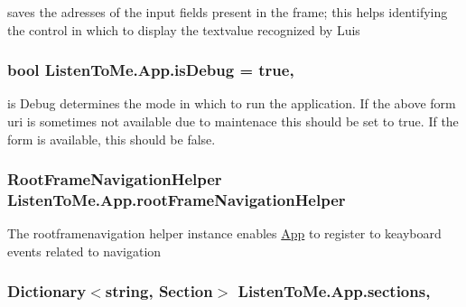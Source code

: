 saves the adresses of the input fields present in the frame; this helps identifying the control in which to display the textvalue recognized by Luis 

\subsubsection[{\texorpdfstring{is\+Debug}{isDebug}}]{\setlength{\rightskip}{0pt plus 5cm}bool Listen\+To\+Me.\+App.\+is\+Debug = true\hspace{0.3cm}{\ttfamily [static]}, {\ttfamily [package]}}\hypertarget{class_listen_to_me_1_1_app_a59acc333f6141d00101170b53ad29754}{}\label{class_listen_to_me_1_1_app_a59acc333f6141d00101170b53ad29754}


is Debug determines the mode in which to run the application. If the above form uri is sometimes not available due to maintenace this should be set to true. If the form is available, this should be false. 

\subsubsection[{\texorpdfstring{root\+Frame\+Navigation\+Helper}{rootFrameNavigationHelper}}]{\setlength{\rightskip}{0pt plus 5cm}Root\+Frame\+Navigation\+Helper Listen\+To\+Me.\+App.\+root\+Frame\+Navigation\+Helper\hspace{0.3cm}{\ttfamily [private]}}\hypertarget{class_listen_to_me_1_1_app_a92eb573f880ce92d5b9fa79b90ba3f41}{}\label{class_listen_to_me_1_1_app_a92eb573f880ce92d5b9fa79b90ba3f41}


The rootframenavigation helper instance enables \hyperlink{class_listen_to_me_1_1_app}{App} to register to keayboard events related to navigation 

\subsubsection[{\texorpdfstring{sections}{sections}}]{\setlength{\rightskip}{0pt plus 5cm}Dictionary$<$string, Section$>$ Listen\+To\+Me.\+App.\+sections\hspace{0.3cm}{\ttfamily [static]}, {\ttfamily [package]}}\hypertarget{class_listen_to_me_1_1_app_a0ceb5219b35307c9377448b1071ee4cc}{}\label{class_listen_to_me_1_1_app_a0ceb5219b35307c9377448b1071ee4cc}


